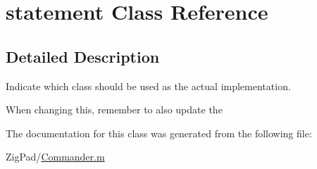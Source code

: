 \hypertarget{classstatement}{
\section{statement Class Reference}
\label{classstatement}
}


\subsection{Detailed Description}
Indicate which class should be used as the actual implementation.

When changing this, remember to also update the 

The documentation for this class was generated from the following file:\begin{DoxyCompactItemize}
\item 
ZigPad/\hyperlink{_commander_8m}{Commander.m}\end{DoxyCompactItemize}
